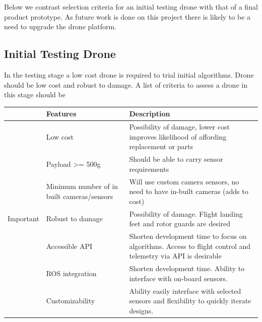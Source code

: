 \documentclass[capstone_report.tex]{subfiles}
\begin{document}
Below we contrast selection criteria for an initial testing drone with that of a final product prototype.  As future work is done on this project there is likely to be a need to upgrade the drone platform.

\subsection{Initial Testing Drone}
In the testing stage a low cost drone is required to trial initial algorithms.  Drone should be low cost and robust to damage.  A list of criteria to assess a drone in this stage should be

\begin{table}[H]
\centering
\label{test_requirements}
\begin{tabular}{lp{6cm}p{8cm}}
\toprule
                               & Features                                   & Description                                                                                                   \\ \midrule
\multirow{7}{*}{Important}     & Low cost                                   & Possibility of damage, lower cost improves likelihood of affording replacement or parts                       \\
                               & Payload \textgreater= 500g                 & Should be able to carry sensor requirements                                                                   \\
                               & Minimum number of in built cameras/sensors & Will use custom camera sensors, no need to have in-built cameras (adds to cost)                               \\
                               & Robust to damage                           & Possibility of damage.  Flight landing feet and rotor guards are desired                                      \\
                               & Accessible API                             & Shorten development time to focus on algorithms.  Access to flight control and telemetry via API is desirable \\
                               & ROS integration                            & Shorten development time.  Ability to interface with on-board sensors.                                        \\
                               & Customizability                            & Ability easily interface with selected sensors and flexibility to quickly iterate designs.                    \\

\end{tabular}
\end{table}
\end{document}
